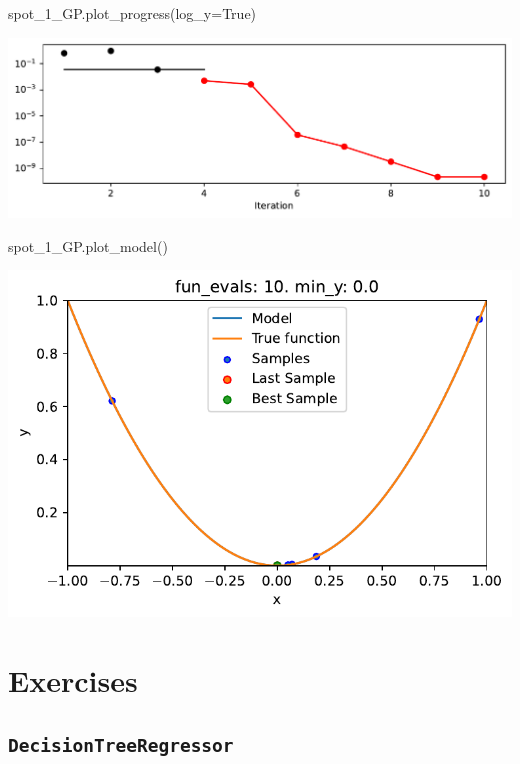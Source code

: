 \documentclass[
  letterpaper,
  DIV=11,
  numbers=noendperiod]{scrreprt}
\newenvironment{Shaded}{\begin{snugshade}}{\end{snugshade}}
\newcommand{\NormalTok}[1]{\textcolor[rgb]{0.00,0.23,0.31}{#1}}
\newcommand{\OperatorTok}[1]{\textcolor[rgb]{0.37,0.37,0.37}{#1}}
\newcommand{\VariableTok}[1]{\textcolor[rgb]{0.07,0.07,0.07}{#1}}
\begin{document}
\begin{Shaded}
\begin{Highlighting}[]
\NormalTok{spot\_1\_GP.plot\_progress(log\_y}\OperatorTok{=}\VariableTok{True}\NormalTok{)}
\end{Highlighting}
\end{Shaded}

\includegraphics{010_num_spot_sklearn_surrogate_files/figure-pdf/cell-26-output-1.pdf}

\begin{Shaded}
\begin{Highlighting}[]
\NormalTok{spot\_1\_GP.plot\_model()}
\end{Highlighting}
\end{Shaded}

\includegraphics{010_num_spot_sklearn_surrogate_files/figure-pdf/cell-27-output-1.pdf}

\section{Exercises}\label{exercises-4}

\subsection{\texorpdfstring{\texttt{DecisionTreeRegressor}}{DecisionTreeRegressor}}\label{decisiontreeregressor}
\end{document}

